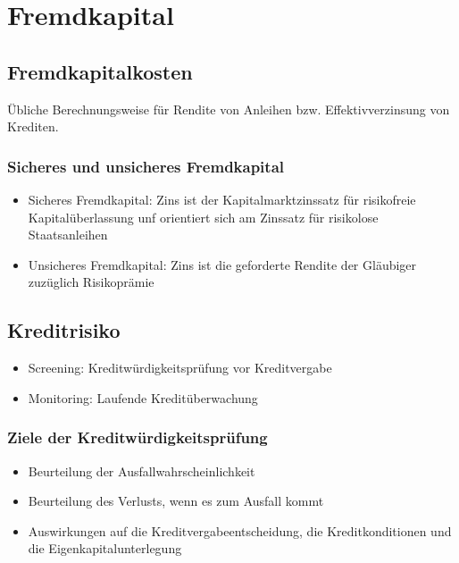 \section{Fremdkapital}

\subsection{Fremdkapitalkosten}
Übliche Berechnungsweise für Rendite von Anleihen bzw. Effektivverzinsung von Krediten.

\subsubsection{Sicheres und unsicheres Fremdkapital}
\begin{itemize}
	\item Sicheres Fremdkapital: Zins ist der Kapitalmarktzinssatz für risikofreie Kapitalüberlassung unf orientiert sich am Zinssatz für risikolose Staatsanleihen
	\item Unsicheres Fremdkapital: Zins ist die geforderte Rendite der Gläubiger zuzüglich Risikoprämie
\end{itemize}


\subsection{Kreditrisiko}
\begin{itemize}
	\item Screening: Kreditwürdigkeitsprüfung vor Kreditvergabe
	\item Monitoring: Laufende Kreditüberwachung
\end{itemize}

\subsubsection{Ziele der Kreditwürdigkeitsprüfung}
\begin{itemize}
	\item Beurteilung der Ausfallwahrscheinlichkeit
	\item Beurteilung des Verlusts, wenn es zum Ausfall kommt
	\item Auswirkungen auf die Kreditvergabeentscheidung, die Kreditkonditionen und die Eigenkapitalunterlegung
\end{itemize}

